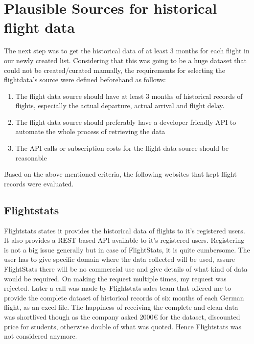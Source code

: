 \section{Plausible Sources for historical flight data}
The next step was to get the historical data of at least 3 months for each flight in our newly created list. Considering that this was going to be a huge dataset that could not be created/curated manually, the requirements for selecting the flightdata's source were defined beforehand as follows:
\begin{enumerate}
    \item The flight data source should have at least 3 months of historical records of flights, especially the actual departure, actual arrival and flight delay.
    \item The flight data source should preferably have a developer friendly API to automate the whole process of retrieving the data
    \item The API calls or subscription costs for the flight data source should be reasonable
\end{enumerate}

Based on the above mentioned criteria, the following websites that kept flight records were evaluated.

\subsection{Flightstats}
Flightstats states it provides the historical data of flights to it's registered users. It also provides a REST based API available to it's registered users. Registering is not a big issue generally but in case of FlightStats, it is quite cumbersome. The user has to give specific domain where the data collected will be used, assure FlightStats there will be no commercial use and give details of what kind of data would be required. On making the request multiple times, my request was rejected. Later a call was made by Flightstats sales team that offered me to provide the complete dataset of historical records of six months of each German flight, as an excel file. The happiness of receiving the complete and clean data was shortlived though as the company asked 2000€ for the dataset, discounted price for students, otherwise double of what was quoted. Hence Flightstats was not considered anymore.

